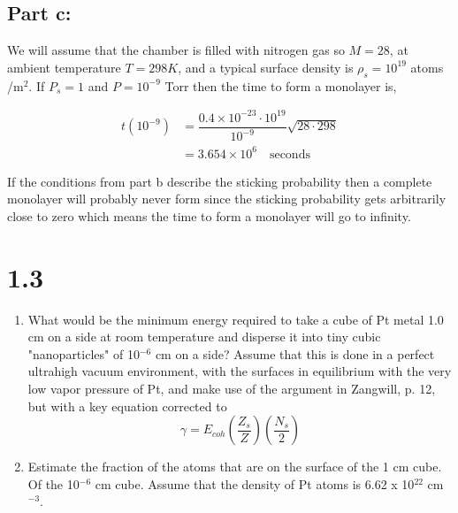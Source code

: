 \documentclass[12pt]{article}
\renewcommand{\=}[1]{\stackrel{#1}{=}} %
\theoremstyle{definition}
\theoremstyle{remark}
\begin{document}
\subsection*{Part c:}

We will assume that the chamber is filled with nitrogen gas so $M=28$, at ambient temperature $T=298K$, and a typical surface density is $\rho_s = 10^19$ atoms /m$^2$. If $P_s = 1$ and $P=10^{-9}$ Torr then the time to form a monolayer is,

\begin{align*}
	t(10^{-9}) &= \dfrac{0.4\times10^{-23}\cdot10^{19}}{10^{-9}}\sqrt{28 \cdot 298}\\[3mm]
		&= 3.654 \times 10^6 \quad \text{seconds}
\end{align*}

If the conditions from part b describe the sticking probability then a complete monolayer will probably never form since the sticking probability gets arbitrarily close to zero which means the time to form a monolayer will go to infinity.


\newpage
\section*{1.3}
\begin{bclogo}[logo=\bcquestion , barre=none]
\newline
\begin{enumerate}
\item What would be the minimum energy required to take a cube of Pt metal 1.0 cm on a side at room temperature and disperse it into tiny cubic "nanoparticles" of 10$^{-6}$ cm on a side? Assume that this is done in a perfect ultrahigh vacuum environment, with the surfaces in equilibrium with the very low vapor pressure of Pt, and make use of the argument in Zangwill, p. 12, but with a key equation corrected to
\[
	\gamma = E_{coh} \left(\dfrac{Z_s}{Z}\right)\left(\dfrac{N_s}{2}\right)
\]
\item  Estimate the fraction of the atoms that are on the surface of the 1 cm cube. Of the 10$^{-6}$ cm cube. Assume that the density of Pt atoms is 6.62 x 10$^{22}$ cm$^{-3}$. 
\end{enumerate}
\end{bclogo}
\vspace{2mm}
\end{document}
